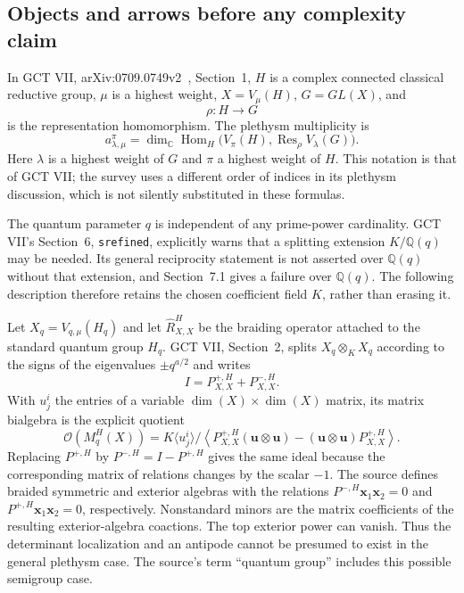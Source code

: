 \subsection{Objects and arrows before any complexity claim}

In GCT VII, arXiv:0709.0749v2~\cite{mulmuley2008gct7}, Section~1, $H$ is a complex connected
classical reductive group, $\mu$ is a highest weight,
$X=V_\mu(H)$, $G=GL(X)$, and
\[
 \rho:H\longrightarrow G
\]
is the representation homomorphism.  The plethysm multiplicity is
\[
 a_{\lambda,\mu}^{\pi}
 =\dim_{\mathbb C}\operatorname{Hom}_{H}
       \bigl(V_\pi(H),\operatorname{Res}_{\rho}V_\lambda(G)\bigr).
\]
Here $\lambda$ is a highest weight of $G$ and $\pi$ a highest weight of
$H$.  This notation is that of GCT VII; the survey uses a different order
of indices in its plethysm discussion, which is not silently substituted
in these formulas.

The quantum parameter $q$ is independent of any prime-power cardinality.
GCT VII's Section~6, \texttt{srefined}, explicitly warns that a splitting
extension $K/\mathbb Q(q)$ may be needed.  Its general reciprocity statement
is not asserted over $\mathbb Q(q)$ without that extension, and Section~7.1
gives a failure over $\mathbb Q(q)$.  The following description therefore
retains the chosen coefficient field $K$, rather than erasing it.

Let $X_q=V_{q,\mu}(H_q)$ and let $\widehat R_{X,X}^{H}$ be the braiding
operator attached to the standard quantum group $H_q$.  GCT VII,
Section~2, splits $X_q\otimes_K X_q$ according to the signs of the
eigenvalues $\pm q^{a/2}$ and writes
\[
 I=P_{X,X}^{+,H}+P_{X,X}^{-,H}.
\]
With $u^i_j$ the entries of a variable $\dim(X)\times\dim(X)$ matrix,
its matrix bialgebra is the explicit quotient
\begin{equation}\label{eq:gct-nrh-frt-source}
 \mathcal O(M_q^H(X))
 =K\langle u^i_j\rangle\Big/
 \left\langle
 P_{X,X}^{+,H}(\mathbf u\otimes\mathbf u)
       -(\mathbf u\otimes\mathbf u)P_{X,X}^{+,H}
 \right\rangle.
\end{equation}
Replacing $P^{+,H}$ by $P^{-,H}=I-P^{+,H}$ gives the same ideal because
the corresponding matrix of relations changes by the scalar $-1$.
The source defines braided symmetric and exterior algebras with the
relations $P^{-,H}\mathbf x_1\mathbf x_2=0$ and
$P^{+,H}\mathbf x_1\mathbf x_2=0$, respectively.  Nonstandard minors
are the matrix coefficients of the resulting exterior-algebra coactions.
The top exterior power can vanish.  Thus the determinant localization
and an antipode cannot be presumed to exist in the general plethysm case.
The source's term ``quantum group'' includes this possible semigroup case.

